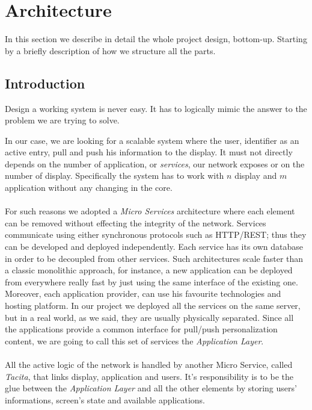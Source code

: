 \documentclass[]{usiinfbachelorproject}
\begin{document}
\section{Architecture}
In this section we describe in detail the whole project design, bottom-up. Starting by a briefly description of how we structure all the parts.
\subsection{Introduction}
Design a working system is never easy. It has to logically mimic the answer to the problem we are trying to solve.

In our case, we are looking for a scalable system where the user, identifier as an active entry, pull and push his information to the display. It must not directly depends on the number of application, or \emph{services}, our network exposes or on the number of display. Specifically the system has to work with $n$ display and $m$ application without any changing in the core. 
\\
\\
For such reasons we adopted a \emph{Micro Services} architecture where each element can be removed without effecting the integrity of the network. Services communicate using either synchronous protocols such as HTTP/REST; thus they can be developed and deployed independently. Each service has its own database in order to be decoupled from other services. Such architectures scale faster than a classic monolithic approach, for instance, a new application can be deployed from everywhere really fast by just using the same interface of the existing one. Moreover, each application provider, can use his favourite technologies and hosting platform. In our project we deployed all the services on the same server, but in a real world, as we said,  they are usually physically separated. Since all the applications provide a common interface for pull/push personalization content, we are going to call this set of services the \emph{Application Layer}.\\
\\
All the active logic of the network is handled by another Micro Service, called \emph{Tacita}, that links display, application and users. It's responsibility is to be the glue between the \emph{Application Layer} and all the other elements by storing users' informations, screen's state and available applications.
\end{document}
